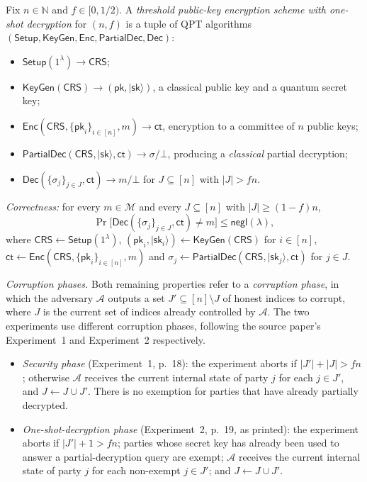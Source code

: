 \documentclass{conjura-conjecture}
\newcommand{\ket}[1]{\lvert #1 \rangle}
\newcommand{\negl}{\mathsf{negl}}
\newcommand{\Msp}{\mathcal{M}}
\newcommand{\Setup}{\mathsf{Setup}}
\newcommand{\KeyGen}{\mathsf{KeyGen}}
\newcommand{\Enc}{\mathsf{Enc}}
\newcommand{\Dec}{\mathsf{Dec}}
\newcommand{\PartialDec}{\mathsf{PartialDec}}
\newcommand{\CRS}{\mathsf{CRS}}
\newcommand{\pk}{\mathsf{pk}}
\newcommand{\sk}{\mathsf{sk}}
\newcommand{\ct}{\mathsf{ct}}
\begin{document}
\begin{definition}\label{def:tosd}
Fix $n \in \mathbb{N}$ and $f \in [0, 1/2)$. A \emph{threshold
public-key encryption scheme with one-shot decryption} for $(n, f)$ is
a tuple of QPT algorithms $(\Setup, \KeyGen, \Enc, \PartialDec,
\Dec)$:
\begin{itemize}[leftmargin=1.2em]
  \item $\Setup(1^{\lambda}) \to \CRS$;
  \item $\KeyGen(\CRS) \to (\pk, \ket{\sk})$, a classical public key
    and a quantum secret key;
  \item $\Enc(\CRS, \{\pk_{i}\}_{i \in [n]}, m) \to \ct$, encryption
    to a committee of $n$ public keys;
  \item $\PartialDec(\CRS, \ket{\sk}, \ct) \to \sigma / \bot$,
    producing a \emph{classical} partial decryption;
  \item $\Dec(\{\sigma_{j}\}_{j \in J}, \ct) \to m / \bot$ for $J
    \subseteq [n]$ with $\lvert J \rvert > f n$.
\end{itemize}

\emph{Correctness:} for every $m \in \Msp$ and every $J \subseteq [n]$
with $\lvert J \rvert \ge (1-f)n$,
\[
  \Pr\bigl[\Dec(\{\sigma_{j}\}_{j \in J}, \ct) \neq m\bigr]
    \le \negl(\lambda),
\]
where $\CRS \gets \Setup(1^{\lambda})$, $(\pk_{i}, \ket{\sk_{i}})
\gets \KeyGen(\CRS)$ for $i \in [n]$, $\ct \gets \Enc(\CRS,
\{\pk_{i}\}_{i \in [n]}, m)$ and $\sigma_{j} \gets \PartialDec(\CRS,
\ket{\sk_{j}}, \ct)$ for $j \in J$.

\emph{Corruption phases.} Both remaining properties refer to a
\emph{corruption phase}, in which the adversary $\mathcal{A}$ outputs
a set $J' \subseteq [n] \setminus J$ of honest indices to corrupt,
where $J$ is the current set of indices already controlled by
$\mathcal{A}$. The two experiments use different corruption phases,
following the source paper's Experiment~1 and Experiment~2
respectively.
\begin{itemize}[leftmargin=1.2em]
  \item \emph{Security phase} (Experiment~1, p.~18): the experiment
    aborts if $\lvert J' \rvert + \lvert J \rvert > f n$; otherwise
    $\mathcal{A}$ receives the current internal state of party $j$ for
    each $j \in J'$, and $J \gets J \cup J'$. There is no exemption
    for parties that have already partially decrypted.
  \item \emph{One-shot-decryption phase} (Experiment~2, p.~19, as
    printed): the experiment aborts if $\lvert J' \rvert + 1 > f n$;
    parties whose secret key has already been used to answer a
    partial-decryption query are exempt; $\mathcal{A}$ receives the
    current internal state of party $j$ for each non-exempt $j \in
    J'$; and $J \gets J \cup J'$.
\end{itemize}


\end{definition}
\end{document}
